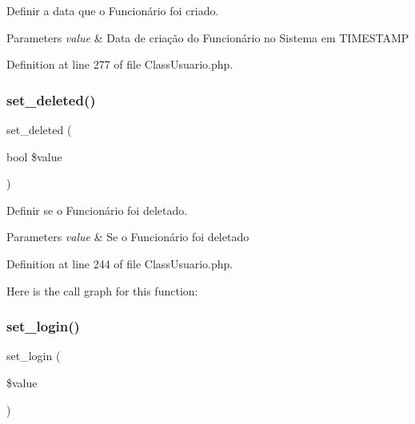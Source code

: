 Definir a data que o Funcionário foi criado. 


\begin{DoxyParams}{Parameters}
{\em value} & Data de criação do Funcionário no Sistema em T\+I\+M\+E\+S\+T\+A\+MP \\
\hline
\end{DoxyParams}


Definition at line 277 of file Class\+Usuario.\+php.

\mbox{\label{class_class_usuario_acd0a4e339896072e5515b8fdcc33344d}} 
\subsubsection{\texorpdfstring{set\+\_\+deleted()}{set\_deleted()}}
{\footnotesize\ttfamily set\+\_\+deleted (\begin{DoxyParamCaption}\item[{bool}]{\$value }\end{DoxyParamCaption})}



Definir se o Funcionário foi deletado. 


\begin{DoxyParams}{Parameters}
{\em value} & Se o Funcionário foi deletado \\
\hline
\end{DoxyParams}


Definition at line 244 of file Class\+Usuario.\+php.

Here is the call graph for this function\+:
\mbox{\label{class_class_usuario_a81f9ed4b60bab54c829ad63c6a6134d2}} 
\subsubsection{\texorpdfstring{set\+\_\+login()}{set\_login()}}
{\footnotesize\ttfamily set\+\_\+login (\begin{DoxyParamCaption}\item[{}]{\$value }\end{DoxyParamCaption})}



